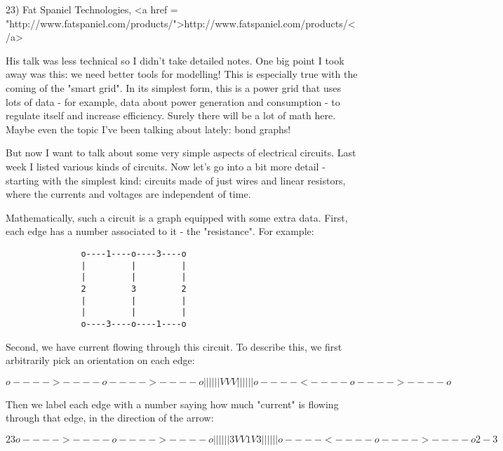 23) Fat Spaniel Technologies, <a href = "http://www.fatspaniel.com/products/">http://www.fatspaniel.com/products/</a>

His talk was less technical so I didn't take detailed notes.  One big
point I took away was this: we need better tools for modelling!  This
is especially true with the coming of the "smart grid".  In its
simplest form, this is a power grid that uses lots of data - for
example, data about power generation and consumption - to regulate
itself and increase efficiency.  Surely there will be a lot of math
here.  Maybe even the topic I've been talking about lately: bond graphs!

But now I want to talk about some very simple aspects of electrical
circuits.  Last week I listed various kinds of circuits.  Now let's go
into a bit more detail - starting with the simplest kind: circuits
made of just wires and linear resistors, where the currents and
voltages are independent of time.

Mathematically, such a circuit is a graph equipped with some extra
data.  First, each edge has a number associated to it - the
"resistance".  For example:

\begin{verbatim}
               o----1----o----3----o
               |         |         | 
               |         |         | 
               2         3         2 
               |         |         | 
               |         |         | 
               o----3----o----1----o
\end{verbatim}
    
Second, we have current flowing through this circuit.  To describe this,
we first arbitrarily pick an orientation on each edge:

$$
               o---->----o---->----o
               |         |         | 
               |         |         | 
               V         V         V 
               |         |         | 
               |         |         | 
               o----<----o---->----o
 
$$
    
Then we label each edge with a number saying how much "current"
is flowing through that edge, in the direction of the arrow:

$$
                    2        3
               o---->----o---->----o
               |         |         | 
               |         |         | 
             3 V         V 1       V 3
               |         |         | 
               |         |         | 
               o----<----o---->----o
                    2       -3
$$
    

